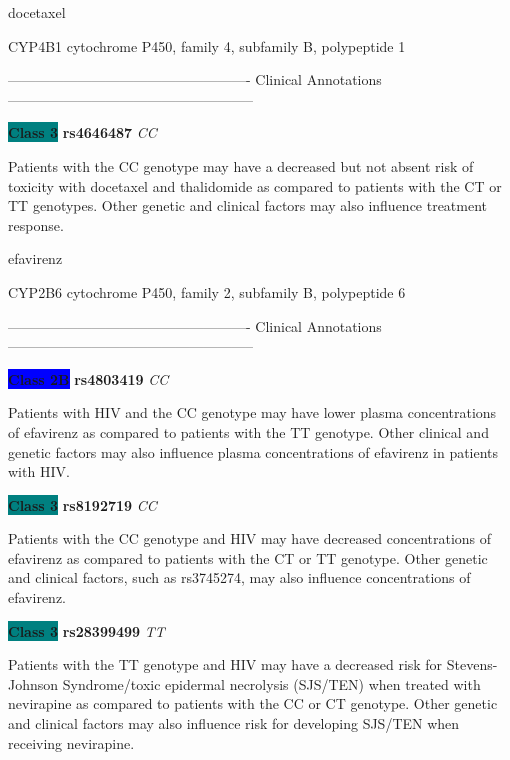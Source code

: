 \documentclass{resume} %
\begin{document}
\begin{rSection}{ docetaxel }
\begin{rSubsection}{ CYP4B1 }{ cytochrome P450, family 4, subfamily B, polypeptide 1 }{}{}
\item[]

\item[] ---------------------------------------------------- Clinical Annotations -----------------------------------------------------\newline
\item \textbf{\colorbox{teal} {Class 3}} \textbf{ rs4646487 } \textit{ CC }
\item[] Patients with the CC genotype may have a decreased but not absent risk of toxicity with docetaxel and thalidomide as compared to patients with the CT or TT genotypes. Other genetic and clinical factors may also influence treatment response.
\end{rSubsection}

\end{rSection}\begin{rSection}{ efavirenz }
\item[]

\begin{rSubsection}{ CYP2B6 }{ cytochrome P450, family 2, subfamily B, polypeptide 6 }{}{}
\item[]

\item[] ---------------------------------------------------- Clinical Annotations -----------------------------------------------------\newline
\item \textbf{\colorbox{blue} {Class 2B}} \textbf{ rs4803419 } \textit{ CC }
\item[] Patients with HIV and the CC genotype may have lower plasma concentrations of efavirenz as compared to patients with the TT genotype. Other clinical and genetic factors may also influence plasma concentrations of efavirenz in patients with HIV.\item \textbf{\colorbox{teal} {Class 3}} \textbf{ rs8192719 } \textit{ CC }
\item[] Patients with the CC genotype and HIV may have decreased concentrations of efavirenz as compared to patients with the CT or TT genotype. Other genetic and clinical factors, such as rs3745274, may also influence concentrations of efavirenz. \item \textbf{\colorbox{teal} {Class 3}} \textbf{ rs28399499 } \textit{ TT }
\item[] Patients with the TT genotype and HIV may have a decreased risk for Stevens-Johnson Syndrome/toxic epidermal necrolysis (SJS/TEN) when treated with nevirapine as compared to patients with the CC or CT genotype. Other genetic and clinical factors may also influence risk for developing SJS/TEN when receiving nevirapine.
\end{rSubsection}


\end{rSection}
\end{document}
